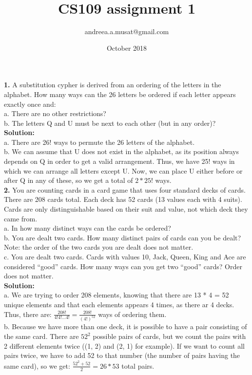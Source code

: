 \documentclass[12pt,a4paper,oneside,draft]{report}
\title{CS109 assignment 1}
\author{andreea.a.musat@gmail.com}
\date{October 2018}
\begin{document}
\maketitle

\textbf{1.} A substitution cypher is derived from an ordering of the letters in the alphabet. How many ways can the 26 letters be ordered if each letter appears exactly once and:\\
a. There are no other restrictions? \\
b. The letters Q and U must be next to each other (but in any order)? \\

\textbf{Solution:} \\

a. There are 26! ways to permute the 26 letters of the alphabet. \\

b. We can assume that U does not exist in the alphabet, as its position always depends on Q in order to get a valid arrangement. Thus, we have 25! ways in which we can arrange all letters except U. Now, we can place U either before or after Q in any of these, so we get a total of $2 * 25!$ ways.\\

\textbf{2.} You are counting cards in a card game that uses four standard decks of cards. There are 208 cards total. Each deck has 52 cards (13 values each with 4 suits). Cards are only distinguishable based on their suit and value, not which deck they came from. \\
a. In how many distinct ways can the cards be ordered? \\
b. You are dealt two cards. How many distinct pairs of cards can you be dealt? Note: the order of the two cards you are dealt does not matter. \\
c. You are dealt two cards. Cards with values 10, Jack, Queen, King and Ace are considered “good” cards. How many ways can you get two “good” cards? Order does not matter. \\

\textbf{Solution:} \\

a. We are trying to order 208 elements, knowing that there are 13 * 4 = 52 unique elements and that each elements appears 4 times, as there ar 4 decks. Thus, there are: $\frac{208!}{4! 4! ... 4!} = \frac{208!}{(4!)^{52}}$ ways of ordering them. \\

b. Because we have more than one deck, it is possible to have a pair consisting of the same card. There are $52^2$ possible pairs of cards, but we count the pairs with 2 different elements twice ((1, 2) and (2, 1) for example). If we want to count all pairs twice, we have to add 52 to that number (the number of pairs having the same card), so we get: $\frac{52^2 + 52}{2} = 26 * 53$ total pairs. \\
\end{document}
